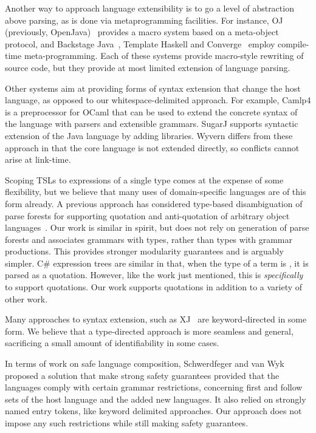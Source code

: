 Another way to approach language extensibility is to go a level of abstraction above parsing, as is done via metaprogramming facilities. For instance, OJ (previously, OpenJava)~\cite{Tatsubori00openjava:a} provides a macro system based on a meta-object protocol, and Backstage Java~\cite{Palmer:2011:BJM:2048066.2048137}, Template Haskell \cite{sheard2002template} and Converge~\cite{Tratt:2008:DSL:1391956.1391958} employ compile-time meta-programming.  Each of these systems provide macro-style rewriting of source code, but they provide at most limited extension of language parsing.

Other systems aim at providing forms of syntax extension that change the host language, as opposed to our whitespace-delimited approach.  For example, Camlp4 \cite{camlp4} is a preprocessor for OCaml that can be used to extend the concrete syntax of the language with parsers and extensible grammars.  SugarJ \cite{Erdweg:2011:SLL:2048147.2048199} supports syntactic extension of the Java language by adding libraries. Wyvern differs from these approach in that the core language is not extended directly, so conflicts cannot arise at link-time.

Scoping TSLs to expressions of a single type comes at the expense of some flexibility, but we believe that many uses of domain-specific languages are of this form already. A previous approach has considered type-based disambiguation of parse forests for supporting quotation and anti-quotation of arbitrary object languages~\cite{bravenboer2005generalized}. Our work is similar in spirit, but does not rely on generation of parse forests and associates grammars with types, rather than types with grammar productions.  This provides stronger modularity guarantees and is arguably simpler. 
 C\# expression trees \cite{Csharp} are similar in that, when the type of a term is , it is parsed as a quotation. However, like the work just mentioned, this is \emph{specifically} to support quotations. Our work supports quotations in addition to a variety of other work.
 
Many approaches to syntax extension, such as XJ~\cite{DBLP:conf/scam/ClarkSW08} are keyword-directed in some form. We believe that a type-directed approach is more seamless and general, sacrificing a small amount of identifiability in some cases. 

In terms of work on safe language composition, Schwerdfeger and van Wyk~\cite{Schwerdfeger:2009:VCD:1542476.1542499} proposed a solution that make strong safety guarantees provided that the languages comply with certain grammar restrictions, concerning first and follow sets of the host language and the added new languages. It also relied on strongly named entry tokens, like keyword delimited approaches. Our approach does not impose any such restrictions while still making safety guarantees.%


